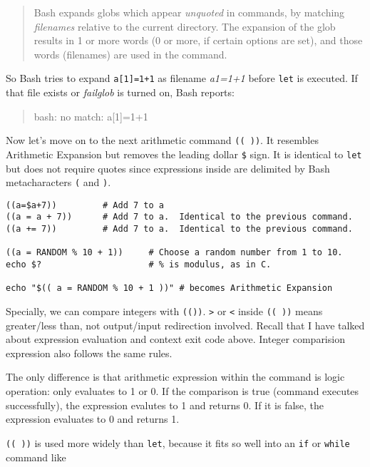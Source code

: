 \begin{quotation}
  Bash expands globs which appear \textit{unquoted} in commands,
  by matching \textit{filenames} relative to the current
  directory. The expansion of the glob results in 1 or more words
  (0 or more, if certain options are set), and those words
  (filenames) are used in the command.
\end{quotation}

So Bash tries to expand \lstinline|a[1]=1+1| as filename
\textit{a1=1+1} before \lstinline|let| is executed. If that file
exists or \textit{failglob} is turned on, Bash reports:

\begin{quotation}
  bash: no match: a[1]=1+1
\end{quotation}

Now let's move on to the next arithmetic command
\lstinline|(( ))|. It resembles Arithmetic Expansion but removes
the leading dollar
\lstinline|$| sign. It is identical to \lstinline|let| but does
not require quotes since expressions inside are delimited by
Bash metacharacters \lstinline|(| and \lstinline|)|.

\begin{lstlisting}
((a=$a+7))         # Add 7 to a
((a = a + 7))      # Add 7 to a.  Identical to the previous command.
((a += 7))         # Add 7 to a.  Identical to the previous command.

((a = RANDOM % 10 + 1))     # Choose a random number from 1 to 10.
echo $?                     # % is modulus, as in C.

echo "$(( a = RANDOM % 10 + 1 ))" # becomes Arithmetic Expansion
\end{lstlisting}

Specially, we can compare integers with
\lstinline|(())|. \lstinline|>| or \lstinline|<| inside
\lstinline|(( ))| means greater/less than, not output/input
redirection involved. Recall that I have talked about expression
evaluation and context exit code above. Integer comparision
expression also follows the same rules.

The only difference is that arithmetic expression within the
command is logic operation: only evaluates to 1 or 0. If the
comparison is true (command executes successfully), the expression
evalutes to 1 and returns 0. If it is false, the expression
evaluates to 0 and returns 1.

\lstinline|(( ))| is used more widely than \lstinline|let|,
because it fits so well into an \lstinline|if| or
\lstinline|while| command like

